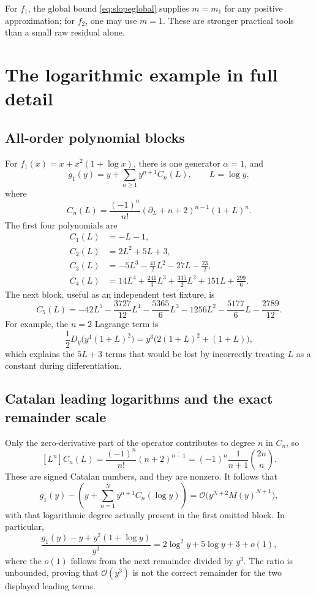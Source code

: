 \documentclass[11pt,a4paper]{article}
\newcommand{\OO}{\mathcal O}
\newcommand{\dd}{\partial_L}
\newcommand{\rising}[2]{\left(#1\right)^{\overline{#2}}}
\theoremstyle{definition}
\begin{document}
For \(f_1\), the global bound \eqref{eq:slopeglobal} supplies \(m=m_1\) for
any positive approximation; for \(f_2\), one may use \(m=1\).
These are stronger practical tools than a small raw residual alone.

\section{The logarithmic example in full detail}
\subsection{All-order polynomial blocks}
For \(f_1(x)=x+x^2(1+\log x)\), there is one generator \(\alpha=1\), and
\begin{equation}\label{eq:logseries}
 g_1(y)=y+\sum_{n\ge1}y^{n+1}C_n(L),\qquad L=\log y,
\end{equation}
where
\begin{equation}\label{eq:logcoeff}
 C_n(L)=\frac{(-1)^n}{n!}
 \rising{\dd+n+2}{n-1}(1+L)^n.
\end{equation}
The first four polynomials are
\begin{align}
 C_1(L)&=-L-1,\nonumber\\
 C_2(L)&=2L^2+5L+3,\nonumber\\
 C_3(L)&=-5L^3-\frac{41}{2}L^2-27L-\frac{23}{2},\label{eq:logpolys}\\
 C_4(L)&=14L^4+\frac{241}{3}L^3+\frac{335}{2}L^2+151L+\frac{299}{6}.
 \nonumber
\end{align}
The next block, useful as an independent test fixture, is
\begin{equation}\label{eq:c5}
 C_5(L)=-42L^5-\frac{3727}{12}L^4-\frac{5365}{6}L^3
        -1256L^2-\frac{5177}{6}L-\frac{2789}{12}.
\end{equation}
For example, the \(n=2\) Lagrange term is
\[
 \frac12D_y\bigl(y^4(1+L)^2\bigr)
 =y^3\bigl(2(1+L)^2+(1+L)\bigr),
\]
which explains the \(5L+3\) terms that would be lost by incorrectly treating
\(L\) as a constant during differentiation.

\subsection{Catalan leading logarithms and the exact remainder scale}
Only the zero-derivative part of the operator contributes to degree \(n\)
in \(C_n\), so
\begin{equation}\label{eq:catalan}
 [L^n]C_n(L)=\frac{(-1)^n}{n!}\rising{n+2}{n-1}
 =(-1)^n\frac1{n+1}\binom{2n}{n}.
\end{equation}
These are signed Catalan numbers, and they are nonzero. It follows that
\begin{equation}\label{eq:logremainder}
 g_1(y)-\left(y+\sum_{n=1}^{N}y^{n+1}C_n(\log y)\right)
 =\OO\bigl(y^{N+2}M(y)^{N+1}\bigr),
\end{equation}
with that logarithmic degree actually present in the first omitted block.
In particular,
\[
 \frac{g_1(y)-y+y^2(1+\log y)}{y^3}
 =2\log^2y+5\log y+3+o(1),
\]
where the \(o(1)\) follows from the next remainder divided by \(y^3\).
The ratio is unbounded, proving that \(\OO(y^3)\) is not the correct
remainder for the two displayed leading terms.
\end{document}
